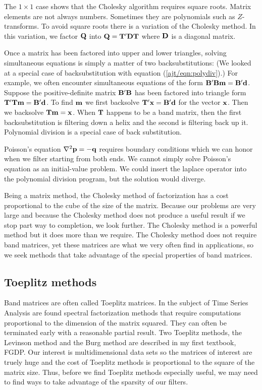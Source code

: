 \par
The $1\times 1$ case shows that the Cholesky algorithm requires square roots.
Matrix elements are not always numbers.
Sometimes they are polynomials such as $Z$-transforms.
To avoid square roots there is a variation
of the Cholesky method.
In this variation, we factor $\bold Q$ into
$\bold Q=\bold T'\bold D\bold T$
where $\bold D$ is a diagonal matrix.

\par
Once a matrix has been factored into upper and lower triangles,
solving simultaneous equations
is simply a matter of two backsubstitutions:
(We looked at a special case of backsubstitution
with equation (\ref{ajt/eqn:polydiv}).)
For example, we often encounter simultaneous equations of the form
$\bold B'\bold B\bold m=\bold B'\bold d$.
Suppose the positive-definite matrix
$\bold B'\bold B$ has been factored into triangle form
$\bold T'\bold T\bold m=\bold B'\bold d$.
To find 
$\bold m$
we first backsolve
$\bold T'\bold x=\bold B'\bold d$
for the vector
$\bold x$.
Then we backsolve
$\bold T\bold m=\bold x$.
When
$\bold T$
happens to be a band matrix,
then the first backsubstitution is filtering down a helix
and the second is filtering back up it.
Polynomial division is a special case of back substitution.

\par
Poisson's equation
$\nabla^2 \bold p = -\bold q$
requires boundary conditions which we can honor
when we filter starting from both ends.
We cannot simply solve Poisson's equation as
an initial-value problem.
We could insert the laplace operator
into the polynomial division program,
but the solution would diverge.

\par
Being a matrix method, the Cholesky method of factorization
has a cost proportional to the cube of the size of the matrix.
Because our problems are very large
and because the Cholesky method
does not produce a useful result if we stop part way to completion,
we look further.
The Cholesky method is a powerful method but it does more than we require.
The Cholesky method does not require band matrices,
yet these matrices are what we very often find in applications,
so we seek methods that take advantage of the special properties
of band matrices.

\subsection{Toeplitz methods}
Band matrices are often called Toeplitz matrices.
In the subject of Time Series Analysis are found
spectral factorization methods that require computations
proportional to the dimension of the matrix squared.
They can often be terminated early with a reasonable partial result.
Two Toeplitz methods, the Levinson method
and the Burg method are described in my first textbook, FGDP.
Our interest is multidimensional data sets so
the matrices of interest are truely huge and the cost
of Toeplitz methods is proportional to the square of the matrix size.
Thus, before we find Toeplitz methods
especially useful, we may need to find
ways to take advantage of the sparsity of our filters.

